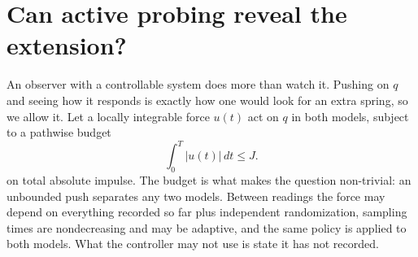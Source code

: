 \documentclass[10pt]{article}
\begin{document}
\section*{Can active probing reveal the extension?}
An observer with a controllable system does more than watch it. Pushing on $q$
and seeing how it responds is exactly how one would look for an extra spring, so
we allow it. Let a locally integrable force $u(t)$ act on $q$ in both models,
subject to a pathwise budget
\begin{equation}
\int_0^T|u(t)|\,dt\leq J.
\label{eq:impulse}
\end{equation}
on total absolute impulse. The budget is what makes the question non-trivial:
an unbounded push separates any two models. Between readings the force may
depend on everything recorded so far plus independent randomization, sampling
times are nondecreasing and may be adaptive, and the same policy is applied to
both models. What the controller may not use is state it has not recorded.
\end{document}
